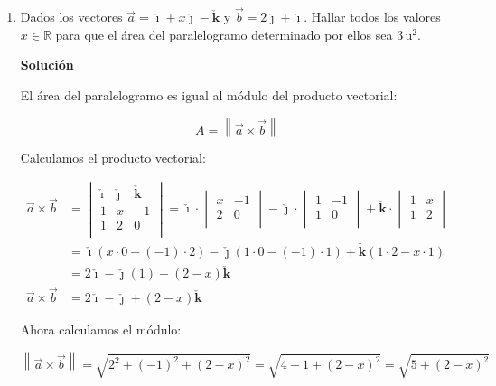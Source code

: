 \documentclass[11pt,a4paper]{article}
\newcommand{\iv}{\bm{\check{\imath}}}
\newcommand{\jv}{\bm{\check{\jmath}}}
\newcommand{\kv}{\check{\bm k}}
\begin{document}
\begin{enumerate}[\hspace{-5mm} 1) ]
Lo que esta pasando es que los tres vectores están sobre un mismo plano, por eso no determinan ningún volumen, es decir {\bf los vectores son coplanares}.





\item Dados los vectores $ \vec{a} =\iv + x \jv - \kv $ y $ \vec{b} = 2 \jv + \iv $. Hallar todos los valores $ x \in \mathbb{R} $ para que el área del paralelogramo determinado por ellos sea $ 3 \, \text{u}^2 $.
    


{\bf Solución} 

El área del paralelogramo es igual al módulo del producto vectorial:

\[
A = \left\| \vec{a} \times \vec{b} \right\|
\]

Calculamos el producto vectorial:

\begin{align*}
\vec{a} \times \vec{b} &=
\begin{vmatrix}
\iv & \jv & \kv \\
1 & x & -1 \\
1 & 2 & 0 \\
\end{vmatrix}
= \iv \cdot
\begin{vmatrix}
x & -1 \\
2 & 0 \\
\end{vmatrix}
- \jv \cdot
\begin{vmatrix}
1 & -1 \\
1 & 0 \\
\end{vmatrix}
+ \kv \cdot
\begin{vmatrix}
1 & x \\
1 & 2 \\
\end{vmatrix}
\\
&= \iv (x \cdot 0 - (-1) \cdot 2) - \jv (1 \cdot 0 - (-1) \cdot 1) + \kv (1 \cdot 2 - x \cdot 1)
\\
&= 2\iv - \jv (1) + (2 - x)\kv
\\
\vec{a} \times \vec{b} &= 2\iv - \jv + (2 - x)\kv 
\end{align*}

Ahora calculamos el módulo:

\[
\left\| \vec{a} \times \vec{b} \right\| = \sqrt{2^2 + (-1)^2 + (2 - x)^2}
= \sqrt{4 + 1 + (2 - x)^2}
= \sqrt{5 + (2 - x)^2}
\]


\end{enumerate}
\end{document}
